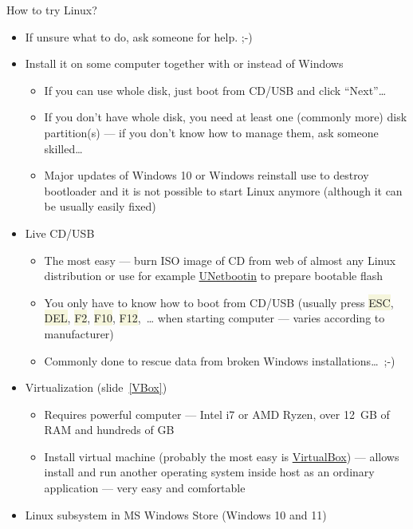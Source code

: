 \documentclass[compress, xelatex, 11pt, xcolor=svgnames, aspectratio=169,
	hyperref={
		bookmarks=true,
		unicode=true,
		colorlinks=true,
		pdftitle={Linux, command line and MetaCentrum},
		plainpages=false,
		pdfauthor={Vojtech Zeisek},
		pdfsubject={Course about use of Linux command line, writing shell scripts and using MetaCentrum of CESNET},
		pdfcreator={XeLaTeX},
		pdfkeywords={Linux, GNU, BASH, shell, command line, MetaCentrum},
		linkcolor=DarkRed, %
		anchorcolor=DarkBlue, %
		citecolor=Indigo, %
		filecolor=NavyBlue, %
		menucolor=DarkMagenta, %
		urlcolor=DarkBlue, %
		},
	url={hyphens, lowtilde} %
	]{beamer}
\renewcommand{\texttt}[1]{\colorbox{Beige}{{\ttfamily #1}}}
\begin{document}

\begin{frame}[allowframebreaks]{How to try Linux?}
	\begin{itemize}
		\item If unsure what to do, ask someone for help. ;-)
		\item Install it on some computer together with or instead of Windows
		\begin{itemize}
			\item If you can use whole disk, just boot from CD/USB and click \enquote{Next}\ldots
			\item If you don't have whole disk, you need at least one (commonly more) disk partition(s) --- if you don't know how to manage them, ask someone skilled\ldots
			\item Major updates of Windows 10 or Windows reinstall use to destroy bootloader and it is not possible to start Linux anymore (although it can be usually easily fixed)
		\end{itemize}
		\item Live CD/USB
		\begin{itemize}
			\item The most easy --- burn ISO image of CD from web of almost any Linux distribution or use for example \href{https://unetbootin.github.io/}{UNetbootin} to prepare bootable flash
			\item You only have to know how to boot from CD/USB (usually press \texttt{ESC}, \texttt{DEL}, \texttt{F2}, \texttt{F10}, \texttt{F12},~\ldots{ }when starting computer --- varies according to manufacturer)
			\item Commonly done to rescue data from broken Windows installations\ldots~;-)
		\end{itemize}
		\item Virtualization (slide~\ref{VBox})
		\begin{itemize}
			\item Requires powerful computer --- Intel i7 or AMD Ryzen, over 12~GB of RAM and hundreds of GB
			\item Install virtual machine (probably the most easy is \href{https://www.virtualbox.org/}{VirtualBox}) --- allows install and run another operating system inside host as an ordinary application --- very easy and comfortable
		\end{itemize}
		\item Linux subsystem in MS Windows Store (Windows 10 and 11)

\end{itemize}
\end{frame}
\end{document}
